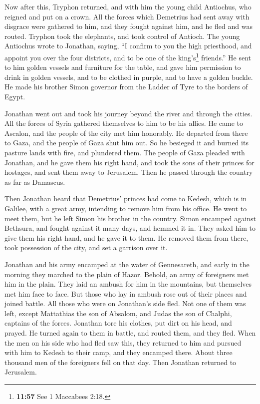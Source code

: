  Now after this, Tryphon returned, and with him the young
child Antiochus, who reigned and put on a crown.  All the
forces which Demetrius had sent away with disgrace were gathered to him,
and they fought against him, and he fled and was routed. 
Tryphon took the elephants, and took control of Antioch. 
The young Antiochus wrote to Jonathan, saying, ``I confirm to you the
high priesthood, and appoint you over the four districts, and to be one
of the king's\footnote{\textbf{11:57} See 1 Maccabees 2:18.} friends.''
 He sent to him golden vessels and furniture for the
table, and gave him permission to drink in golden vessels, and to be
clothed in purple, and to have a golden buckle.  He made
his brother Simon governor from the Ladder of Tyre to the borders of
Egypt.

 Jonathan went out and took his journey beyond the river
and through the cities. All the forces of Syria gathered themselves to
him to be his allies. He came to Ascalon, and the people of the city met
him honorably.  He departed from there to Gaza, and the
people of Gaza shut him out. So he besieged it and burned its pasture
lands with fire, and plundered them.  The people of Gaza
pleaded with Jonathan, and he gave them his right hand, and took the
sons of their princes for hostages, and sent them away to Jerusalem.
Then he passed through the country as far as Damascus.

 Then Jonathan heard that Demetrius' princes had come to
Kedesh, which is in Galilee, with a great army, intending to remove him
from his office.  He went to meet them, but he left Simon
his brother in the country.  Simon encamped against
Bethsura, and fought against it many days, and hemmed it in.
 They asked him to give them his right hand, and he gave
it to them. He removed them from there, took possession of the city, and
set a garrison over it.

 Jonathan and his army encamped at the water of
Gennesareth, and early in the morning they marched to the plain of
Hazor.  Behold, an army of foreigners met him in the
plain. They laid an ambush for him in the mountains, but themselves met
him face to face.  But those who lay in ambush rose out
of their places and joined battle. All those who were on Jonathan's side
fled.  Not one of them was left, except Mattathias the
son of Absalom, and Judas the son of Chalphi, captains of the forces.
 Jonathan tore his clothes, put dirt on his head, and
prayed.  He turned again to them in battle, and routed
them, and they fled.  When the men on his side who had
fled saw this, they returned to him and pursued with him to Kedesh to
their camp, and they encamped there.  About three
thousand men of the foreigners fell on that day. Then Jonathan returned
to Jerusalem.

